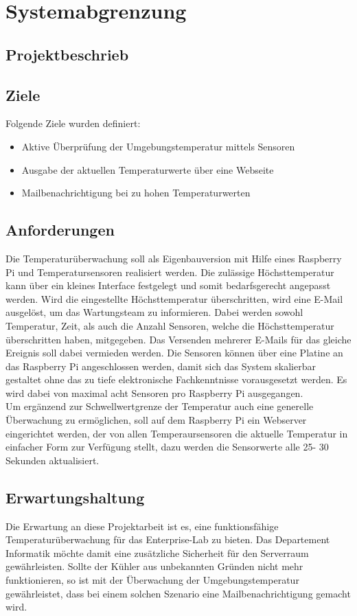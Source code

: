 \section{Systemabgrenzung}
\subsection{Projektbeschrieb}
\subsection{Ziele}
Folgende Ziele wurden definiert:
\begin{itemize}
\item Aktive Überprüfung der Umgebungstemperatur mittels Sensoren
\item Ausgabe der aktuellen Temperaturwerte über eine Webseite
\item Mailbenachrichtigung bei zu hohen Temperaturwerten
\end{itemize}

\subsection{Anforderungen}
Die Temperaturüberwachung soll als Eigenbauversion mit Hilfe eines Raspberry Pi und Temperatursensoren realisiert werden. Die zulässige Höchsttemperatur kann über ein kleines Interface festgelegt und somit bedarfsgerecht angepasst werden. Wird die eingestellte Höchsttemperatur überschritten, wird eine E-Mail ausgelöst, um das Wartungsteam zu informieren. Dabei werden sowohl Temperatur, Zeit, als auch die Anzahl Sensoren, welche die Höchsttemperatur überschritten haben, mitgegeben. Das Versenden mehrerer E-Mails für das gleiche Ereignis soll dabei vermieden werden. Die Sensoren können über eine Platine an das Raspberry Pi angeschlossen werden, damit sich das System skalierbar gestaltet ohne das zu tiefe elektronische Fachkenntnisse vorausgesetzt werden. Es wird dabei von maximal acht Sensoren pro Raspberry Pi ausgegangen.\\
Um ergänzend zur Schwellwertgrenze der Temperatur auch eine generelle Überwachung zu ermöglichen, soll auf dem Raspberry Pi ein Webserver eingerichtet werden, der von allen Temperaursensoren die aktuelle Temperatur in einfacher Form zur Verfügung stellt, dazu werden die Sensorwerte alle 25- 30 Sekunden aktualisiert.
\subsection{Erwartungshaltung}
Die Erwartung an diese Projektarbeit ist es, eine funktionsfähige  Temperaturüberwachung für das Enterprise-Lab zu bieten. Das Departement Informatik möchte damit eine zusätzliche Sicherheit für den Serverraum gewährleisten. Sollte der Kühler aus unbekannten Gründen nicht mehr funktionieren, so ist mit der Überwachung der Umgebungstemperatur gewährleistet, dass bei einem solchen Szenario eine Mailbenachrichtigung gemacht wird.
